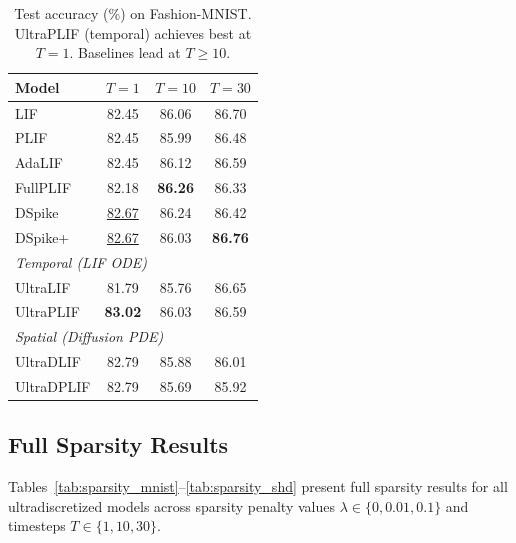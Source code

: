 \documentclass{article}
\theoremstyle{plain}
\theoremstyle{definition}
\theoremstyle{remark}
\begin{document}
\begin{table}[h]
\caption{Test accuracy (\%) on Fashion-MNIST. UltraPLIF (temporal) achieves best at $T{=}1$. Baselines lead at $T{\geq}10$.}
\label{tab:fashion}
\vskip 0.1in
\begin{center}
\begin{small}
\begin{tabular}{lccc}
\toprule
Model & $T{=}1$ & $T{=}10$ & $T{=}30$ \\
\midrule
LIF        & 82.45 & 86.06 & 86.70 \\
PLIF       & 82.45 & 85.99 & 86.48 \\
AdaLIF     & 82.45 & 86.12 & 86.59 \\
FullPLIF   & 82.18 & \textbf{86.26} & 86.33 \\
DSpike     & \underline{82.67} & 86.24 & 86.42 \\
DSpike+    & \underline{82.67} & 86.03 & \textbf{86.76} \\
\midrule
\multicolumn{4}{l}{\textit{Temporal (LIF ODE)}} \\
UltraLIF   & 81.79 & 85.76 & 86.65 \\
UltraPLIF  & \textbf{83.02} & 86.03 & 86.59 \\
\midrule
\multicolumn{4}{l}{\textit{Spatial (Diffusion PDE)}} \\
UltraDLIF  & 82.79 & 85.88 & 86.01 \\
UltraDPLIF & 82.79 & 85.69 & 85.92 \\
\bottomrule
\end{tabular}
\end{small}
\end{center}
\vskip -0.1in
\end{table}

\subsection{Full Sparsity Results}
\label{app:sparsity}

Tables~\ref{tab:sparsity_mnist}--\ref{tab:sparsity_shd} present full sparsity results for all ultradiscretized models across sparsity penalty values $\lambda \in \{0, 0.01, 0.1\}$ and timesteps $T \in \{1, 10, 30\}$.
\end{document}
